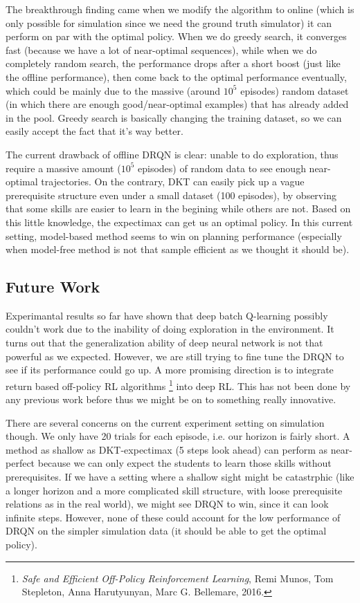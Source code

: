 The breakthrough finding came when we modify the algorithm to online (which is only possible for simulation since we need the ground truth simulator) it can perform on par with the optimal policy. When we do greedy search, it converges fast (because we have a lot of near-optimal sequences), while when we do completely random search, the performance drops after a short boost (just like the offline performance), then come back to the optimal performance eventually, which could be mainly due to the massive (around $10^5$ episodes) random dataset (in which there are enough good/near-optimal examples) that has already added in the pool. Greedy search is basically changing the training dataset, so we can easily accept the fact that it’s way better.

The current drawback of offline DRQN is clear: unable to do exploration, thus require a massive amount ($10^5$ episodes) of random data to see enough near-optimal trajectories. On the contrary, DKT can easily pick up a vague prerequisite structure even under a small dataset (100 episodes), by observing that some skills are easier to learn in the begining while others are not. Based on this little knowledge, the expectimax can get us an optimal policy. In this current setting, model-based method seems to win on planning performance (especially when model-free method is not that sample efficient as we thought it should be).

\subsection{Future Work}

Experimantal results so far have shown that deep batch Q-learning possibly couldn't work due to the inability of doing exploration in the environment. It turns out that the generalization ability of deep neural network is not that powerful as we expected. However, we are still trying to fine tune the DRQN to see if its performance could go up. A more promising direction is to integrate return based off-policy RL algorithms \footnote{\textit{Safe and Efficient Off-Policy Reinforcement Learning}, Remi Munos, Tom Stepleton, Anna Harutyunyan, Marc G. Bellemare, 2016.} into deep RL. This has not been done by any previous work before thus we might be on to something really innovative.

There are several concerns on the current experiment setting on simulation though. We only have 20 trials for each episode, i.e. our horizon is fairly short. A method as shallow as DKT-expectimax (5 steps look ahead) can perform as near-perfect because we can only expect the students to learn those skills without prerequisites. If we have a setting where a shallow sight might be catastrphic (like a longer horizon and a more complicated skill structure, with loose prerequisite relations as in the real world), we might see DRQN to win, since it can look infinite steps. However, none of these could account for the low performance of DRQN on the simpler simulation data (it should be able to get the optimal policy).

